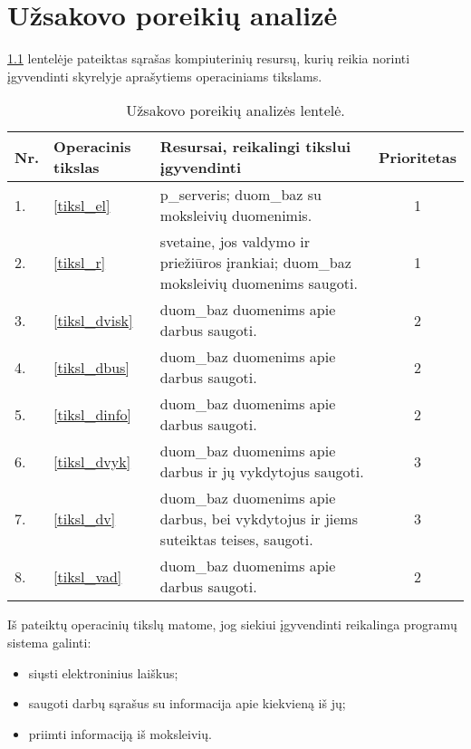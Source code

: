 \chapter{Užsakovo poreikių analizė}


\ref{tab:poreikiai} lentelėje pateiktas sąrašas kompiuterinių resursų, 
kurių reikia norinti įgyvendinti \emph{}
skyrelyje aprašytiems operaciniams tikslams.

\begin{table}[h!]
  \centering
  \begin{tabular}[]{| l | p{1.6cm} | p{5.8cm} | c |}
    \hline
    Nr. & Operacinis tikslas & Resursai, reikalingi tikslui įgyvendinti &
    Prioritetas \\
    \hline
    1. & \ref{tiksl_el} & 
      \Gls{p_serveris}; \gls{duom_baz} su moksleivių duomenimis. & 1 \\
    \hline
    2. & \ref{tiksl_r} & 
      \Gls{svetaine}, jos valdymo ir priežiūros įrankiai; 
      \gls{duom_baz} moksleivių duomenims saugoti. & 1 \\
    \hline
    3. & \ref{tiksl_dvisk} &
      \Gls{duom_baz} duomenims apie darbus saugoti. & 2 \\
    \hline
    4. & \ref{tiksl_dbus} &
      \Gls{duom_baz} duomenims apie darbus saugoti. & 2 \\
    \hline
    5. & \ref{tiksl_dinfo} &
      \Gls{duom_baz} duomenims apie darbus saugoti. & 2 \\
    \hline
    6. & \ref{tiksl_dvyk} &
      \Gls{duom_baz} duomenims apie darbus ir jų vykdytojus 
      saugoti. & 3 \\
    \hline
    7. & \ref{tiksl_dv} &
      \Gls{duom_baz} duomenims apie darbus, bei vykdytojus ir 
      jiems suteiktas teises, saugoti. & 3 \\
    \hline
    8. & \ref{tiksl_vad} &
      \Gls{duom_baz} duomenims apie darbus saugoti. & 2 \\
    \hline
  \end{tabular}
  \caption{Užsakovo poreikių analizės lentelė.}
  \label{tab:poreikiai}
\end{table}

Iš pateiktų operacinių tikslų matome, jog siekiui įgyvendinti reikalinga
programų sistema galinti:
\begin{itemize}
  \item siųsti elektroninius laiškus;
  \item saugoti darbų sąrašus su informacija apie kiekvieną iš jų;
  \item priimti informaciją iš moksleivių.
\end{itemize}
